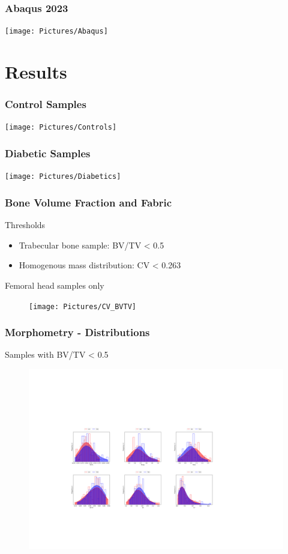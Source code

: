 \documentclass[xcolor=table,11pt]{beamer}
\begin{document}
	\begin{frame}
		\frametitle{Abaqus 2023}
		\texttt{[image: Pictures/Abaqus]}\\
	\end{frame}

	\section{Results}

	\begin{frame}
		\frametitle{Control Samples}
		\texttt{[image: Pictures/Controls]}
	\end{frame}

	\begin{frame}
		\frametitle{Diabetic Samples}
		\texttt{[image: Pictures/Diabetics]}
	\end{frame}

	\begin{frame}
		\frametitle{Bone Volume Fraction and Fabric}
		Thresholds
		\begin{itemize}
			\item Trabecular bone sample: BV/TV < 0.5
			\item Homogenous mass distribution: CV < 0.263 \cite{p1}
		\end{itemize}
		Femoral head samples only
		\begin{figure}
			\centering
			\texttt{[image: Pictures/CV\_BVTV]}			
		\end{figure}

	\end{frame}

	\begin{frame}
		\frametitle{Morphometry - Distributions}
		Samples with BV/TV < 0.5\\\vfill
		\begin{figure}
			\centering
			\includegraphics[width=\linewidth, trim=100 0 100 0]{Pictures/Morphometry}			
		\end{figure}
	\end{frame}
\end{document}
